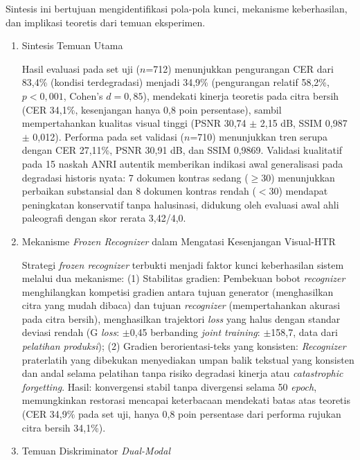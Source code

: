 Sintesis ini bertujuan mengidentifikasi pola-pola kunci, mekanisme keberhasilan, dan implikasi teoretis dari temuan eksperimen.
\begin{enumerate}[leftmargin=1.5em, labelsep=0.5em, itemindent=0pt, label=\arabic*., topsep=0pt, partopsep=0pt]
    \item Sintesis Temuan Utama
    
    Hasil evaluasi pada set uji ($n$=712) menunjukkan pengurangan CER dari 83,4\% (kondisi terdegradasi) menjadi 34,9\% (pengurangan relatif 58,2\%, $p<0,001$, Cohen's $d=0,85$), mendekati kinerja teoretis pada citra bersih (CER 34,1\%, kesenjangan hanya 0,8 poin persentase), sambil mempertahankan kualitas visual tinggi (PSNR 30,74 $\pm$ 2,15 dB, SSIM 0,987 $\pm$ 0,012). Performa pada set validasi ($n$=710) menunjukkan tren serupa dengan CER 27,11\%, PSNR 30,91 dB, dan SSIM 0,9869. Validasi kualitatif pada 15 naskah ANRI autentik memberikan indikasi awal generalisasi pada degradasi historis nyata: 7 dokumen kontras sedang ($\geq$30) menunjukkan perbaikan substansial dan 8 dokumen kontras rendah ($<$30) mendapat peningkatan konservatif tanpa halusinasi, didukung oleh evaluasi awal ahli paleografi dengan skor rerata 3,42/4,0.

    \item Mekanisme \textit{Frozen Recognizer} dalam Mengatasi Kesenjangan Visual-HTR
    
    Strategi \textit{frozen recognizer} terbukti menjadi faktor kunci keberhasilan sistem melalui dua mekanisme: (1) Stabilitas gradien: Pembekuan bobot \textit{recognizer} menghilangkan kompetisi gradien antara tujuan generator (menghasilkan citra yang mudah dibaca) dan tujuan \textit{recognizer} (mempertahankan akurasi pada citra bersih), menghasilkan trajektori \textit{loss} yang halus dengan standar deviasi rendah (G \textit{loss}: $\pm$0,45 berbanding \textit{joint training}: $\pm$158,7, data dari \textit{pelatihan produksi}); (2) Gradien berorientasi-teks yang konsisten: \textit{Recognizer} praterlatih yang dibekukan menyediakan umpan balik tekstual yang konsisten dan andal selama pelatihan tanpa risiko degradasi kinerja atau \textit{catastrophic forgetting}. Hasil: konvergensi stabil tanpa divergensi selama 50 \textit{epoch}, memungkinkan restorasi mencapai keterbacaan mendekati batas atas teoretis (CER 34,9\% pada set uji, hanya 0,8 poin persentase dari performa rujukan citra bersih 34,1\%).

    \item Temuan Diskriminator \textit{Dual-Modal}
    

\end{enumerate}
